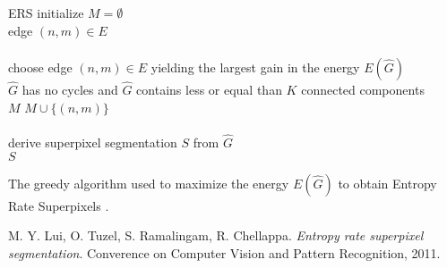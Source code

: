 \documentclass[12pt,a4paper]{article}
\begin{document}
	\begin{algorithm}[t]
		\begin{algo}{ERS}{\label{algo:related-work-ers}}
			initialize $M = \emptyset$\\
			\qforeach edge $(n,m) \in E$\\
				\\
				choose edge $(n,m) \in E$ yielding the largest gain in the energy $E(\hat{G})$\\
				\qif $\hat{G}$ has no cycles and $\hat{G}$ contains less or equal than $K$ connected components\\
					\qthen $M$ \qlet $M \cup \{(n,m)\}$\qfi\qrof\\
			\\
			derive superpixel segmentation $S$ from $\hat{G}$\\
			\qreturn $S$
		\end{algo}
		\caption{The greedy algorithm used to maximize the energy $E(\hat{G})$ to obtain Entropy Rate Superpixels \cite{LiuTuzelRamalingamChellappa}.}
		\label{fig:related-work-ers-algorithm}
	\end{algorithm}

	\begin{thebibliography}{1}
		M. Y. Lui, O. Tuzel, S. Ramalingam, R. Chellappa.
		\emph{Entropy rate superpixel segmentation}.
		Converence on Computer Vision and Pattern Recognition, 2011.
	\end{thebibliography}
\end{document}
